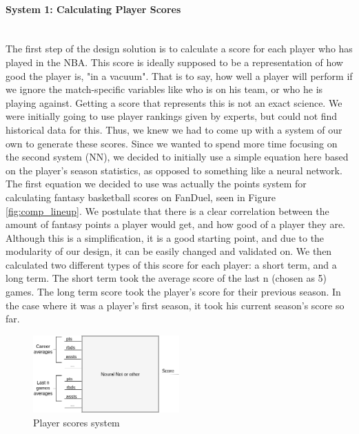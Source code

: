 \paragraph{System 1: Calculating Player Scores}\mbox{}\\
The first step of the design solution is to calculate a score for each player who has played in the NBA. This score is ideally supposed to be a representation of how good the player is, "in a vacuum". That is to say, how well a player will perform if we ignore the match-specific variables like who is on his team, or who he is playing against. Getting a score that represents this is not an exact science. We were initially going to use player rankings given by experts, but could not find historical data for this. Thus, we knew we had to come up with a system of our own to generate these scores. Since we wanted to spend more time focusing on the second system (NN), we decided to initially use a simple equation here based on the player's season statistics, as opposed to something like a neural network. The first equation we decided to use was actually the points system for calculating fantasy basketball scores on FanDuel, seen in Figure \ref{fig:comp_lineup}. We postulate that there is a clear correlation between the amount of fantasy points a player would get, and how good of a player they are. Although this is a simplification, it is a good starting point, and due to the modularity of our design, it can be easily changed and validated on. We then calculated two different types of this score for each player: a short term, and a long term. The short term took the average score of the last n (chosen as 5) games. The long term score took the player's score for their previous season. In the case where it was a player's first season, it took his current season's score so far.
\begin{figure}[ht]
    \centering
    \includegraphics[width=0.5\textwidth]{figures/player_scores}
    \caption{Player scores system}
    \label{fig:player_scores}
\end{figure}
